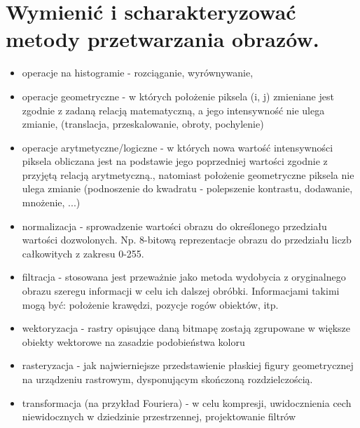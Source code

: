 \documentclass[12pt,a4paper]{article}
\begin{document}
	\section{Wymienić i scharakteryzować metody przetwarzania obrazów.}
	\begin{itemize}
		\item operacje na histogramie - rozciąganie, wyrównywanie, 
		\item operacje geometryczne - w których położenie piksela (i, j) zmieniane jest zgodnie z zadaną relacją matematyczną, a jego intensywność nie ulega zmianie, (translacja, przeskalowanie, obroty, pochylenie)
		\item operacje arytmetyczne/logiczne - w których nowa wartość intensywności piksela obliczana jest na podstawie jego poprzedniej wartości zgodnie z przyjętą relacją arytmetyczną., natomiast położenie geometryczne piksela nie ulega zmianie (podnoszenie do kwadratu - polepszenie kontrastu, dodawanie, mnożenie, ...)
		\item normalizacja - sprowadzenie wartości obrazu do określonego przedziału wartości dozwolonych. Np. 8-bitową reprezentacje obrazu do przedziału liczb całkowitych z zakresu 0-255.
		\item filtracja - stosowana jest przeważnie jako metoda wydobycia z oryginalnego obrazu szeregu informacji w celu ich dalszej obróbki. Informacjami takimi mogą być: położenie krawędzi, pozycje rogów obiektów, itp. 
		\item wektoryzacja -  rastry opisujące daną bitmapę zostają zgrupowane w większe obiekty wektorowe na zasadzie podobieństwa koloru
		\item rasteryzacja - jak najwierniejsze przedstawienie płaskiej figury geometrycznej na urządzeniu rastrowym, dysponującym skończoną rozdzielczością.
		\item transformacja (na przykład Fouriera) - w celu kompresji, uwidocznienia cech niewidocznych w dziedzinie przestrzennej, projektowanie filtrów
	\end{itemize}
\end{document}
